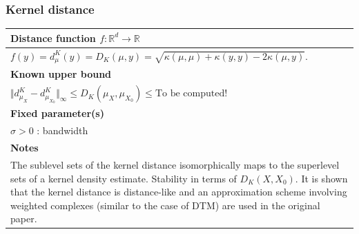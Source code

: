 \documentclass[10pt,a4paper]{article}
\theoremstyle{definition}
\newcommand{\R}{\mathbb{R}}
\begin{document}
\subsubsection{Kernel distance}
\begin{tabularx}{\textwidth}{|X|}
	\hline
	\textbf{Distance function $f\colon\R^d\to\R$}  \\ \hline
	$f(y)=d_{\mu}^K(y) = D_K(\mu, y) = \sqrt{\kappa(\mu,\mu)+\kappa(y,y)-2\kappa(\mu,y)}$.
	\\ \hline
	\textbf{Known upper bound}  \\ \hline
	$
	\Vert d^K_{\mu_X}-d^K_{\mu_{X_0}}\Vert_\infty \leq D_K(\mu_X, \mu_{X_0}) \leq \text{To be computed!}
	$
	\\ \hline
	\textbf{Fixed parameter(s)} \\ \hline
	$\sigma>0$ : bandwidth
	\\ \hline
	\textbf{Notes}              \\ \hline
	The sublevel sets of the kernel distance isomorphically maps to the superlevel sets of a kernel density estimate. Stability in terms of $D_K(X, X_0)$. It is shown that the kernel distance is distance-like and an approximation scheme involving weighted complexes (similar to the case of DTM) are used in the original paper.
	\\ \hline
\end{tabularx}

\printbibliography
\end{document}
